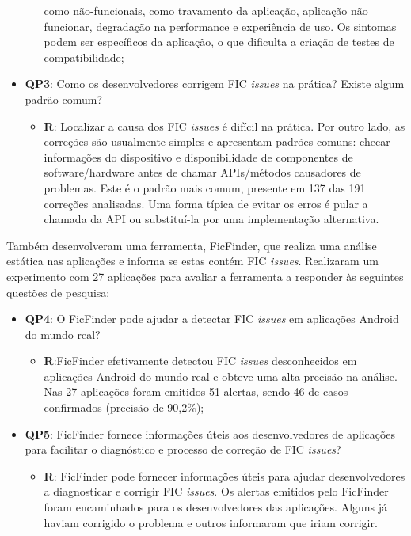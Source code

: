\begin{itemize}
\begin{itemize}
	        como não-funcionais, como travamento da aplicação, aplicação não funcionar,
	        degradação na performance e experiência de uso. Os sintomas podem ser
	        específicos da aplicação, o que dificulta a criação de testes de
	        compatibilidade;
	    \end{itemize}
	\item \textbf{QP3}: Como os desenvolvedores corrigem FIC \textit{issues} na
	prática?
	Existe algum padrão comum?
	    \begin{itemize}
	    \item \textbf{R}: Localizar a causa dos FIC \textit{issues} é difícil na
	    prática.
	    Por outro lado, as correções são usualmente simples e apresentam padrões
	    comuns: checar informações do dispositivo e disponibilidade de componentes
	    de software/hardware antes de chamar APIs/métodos causadores de problemas.
	    Este é o padrão mais comum, presente em 137 das 191 correções analisadas.
	    Uma forma típica de evitar os erros é pular a chamada da API ou substituí-la
	    por uma implementação alternativa.
	    \end{itemize}
\end{itemize}

Também desenvolveram uma ferramenta, FicFinder, que realiza uma análise estática
nas aplicações e informa se estas contém FIC \textit{issues}. Realizaram um experimento
com 27 aplicações para avaliar a ferramenta a responder às seguintes questões de
pesquisa:
\begin{itemize}
    \item \textbf{QP4}: O FicFinder pode ajudar a detectar FIC \textit{issues} em
    aplicações Android do mundo real?
        \begin{itemize}
            \item \textbf{R}:FicFinder efetivamente detectou FIC \textit{issues}
            desconhecidos em aplicações Android do mundo real e obteve uma alta
            precisão na análise. Nas 27 aplicações foram emitidos 51 alertas,
            sendo 46 de casos confirmados (precisão de 90,2\%);
        \end{itemize}
    \item \textbf{QP5}: FicFinder fornece informações úteis aos desenvolvedores
    de aplicações para facilitar o diagnóstico e processo de correção de FIC
    \textit{issues}?
        \begin{itemize}
            \item \textbf{R}: FicFinder pode fornecer informações úteis para ajudar
            desenvolvedores a diagnosticar e corrigir FIC \textit{issues}. Os
            alertas emitidos pelo FicFinder foram encaminhados para os desenvolvedores
            das aplicações. Alguns já haviam corrigido o problema e outros informaram
            que iriam corrigir.
        \end{itemize}
\end{itemize}

